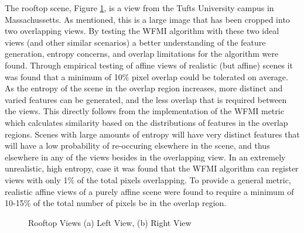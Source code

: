 %
%
%
%
%
%

%
%
%



The rooftop scene, Figure \ref{RooftopImages}, is a view from the Tufts University campus in Massachussetts. As mentioned, this is a large image that has been cropped into two overlapping views. By testing the WFMI algorithm with these two ideal views (and other similar scenarios) a better understanding of the feature generation, entropy concerns, and overlap limitations for the algorithm were found. Through empirical testing of affine views of realistic (but affine) scenes it was found that a minimum of 10\% pixel overlap could be tolerated on average. As the entropy of  the scene in the overlap region increases, more distinct and varied features can be generated, and the less overlap that is required between the views. This directly follows from the implementation of the WFMI metric which calculates similarity based on the distributions of features in the overlap regions. Scenes with large amounts of entropy will have very distinct features that will have a low probability of re-occuring elsewhere in the scene, and thus elsewhere in any of the views besides in the overlapping view. In an extremely unrealistic, high entropy, case it was found that the WFMI algorithm can register views with only 1\% of the total pixels overlapping. To provide a general metric, realistic affine views of a purely affine scene were found to require a minimum of 10-15\% of the total number of pixels be in the overlap region.

\begin{figure}[h]
\label{RooftopImages}
\centering
{}
\caption{Rooftop Views (a) Left View, (b) Right View}
\end{figure}

